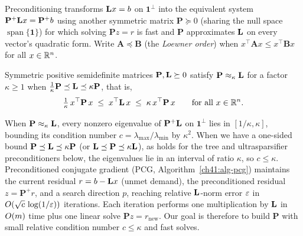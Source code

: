 Preconditioning transforms $\mathbf{L} x = b$ on $\mathbf{1}^\perp$ into the equivalent system $\mathbf{P}^{+}\mathbf{L} x = \mathbf{P}^{+}b$ using another symmetric matrix $\mathbf{P} \succeq 0$ (sharing the null space $\operatorname{span}\{\mathbf{1}\}$) for which solving $\mathbf{P} z = r$ is fast and $\mathbf{P}$ approximates $\mathbf{L}$ on every vector's quadratic form. Write $\mathbf{A} \preceq \mathbf{B}$ (the \emph{Loewner order}) when $x^\top \mathbf{A} x \le x^\top \mathbf{B} x$ for all $x \in \mathbb{R}^n$.

\begin{definition}\label{ch41:def-spectral}
Symmetric positive semidefinite matrices $\mathbf{P},\mathbf{L}\succeq 0$ satisfy $\mathbf{P}\approx_\kappa \mathbf{L}$ for a factor $\kappa \ge 1$ when $\tfrac{1}{\kappa}\mathbf{P} \preceq \mathbf{L} \preceq \kappa\mathbf{P}$, that is,
\[
  \tfrac{1}{\kappa}\,x^\top \mathbf{P}\,x \;\le\; x^\top \mathbf{L}\,x \;\le\; \kappa\,x^\top \mathbf{P}\,x
  \qquad\text{for all } x \in \mathbb{R}^n .
\]
\end{definition}

When $\mathbf{P}\approx_\kappa\mathbf{L}$, every nonzero eigenvalue of $\mathbf{P}^{+}\mathbf{L}$ on $\mathbf{1}^\perp$ lies in $[1/\kappa,\kappa]$, bounding its condition number $c = \lambda_{\max}/\lambda_{\min}$ by $\kappa^2$. When we have a one-sided bound $\mathbf{P}\preceq\mathbf{L}\preceq\kappa\mathbf{P}$ (or $\mathbf{L}\preceq\mathbf{P}\preceq\kappa\mathbf{L}$), as holds for the tree and ultrasparsifier preconditioners below, the eigenvalues lie in an interval of ratio $\kappa$, so $c \le \kappa$. Preconditioned conjugate gradient (PCG, Algorithm~\ref{ch41:alg-pcg}) maintains the current residual $r = b - \mathbf{L} x$ (unmet demand), the preconditioned residual $z = \mathbf{P}^{+}r$, and a search direction $p$, reaching relative $\mathbf{L}$-norm error $\varepsilon$ in $O(\sqrt{c}\,\log(1/\varepsilon))$ iterations. Each iteration performs one multiplication by $\mathbf{L}$ in $O(m)$ time plus one linear solve $\mathbf{P} z = r_{\mathrm{new}}$. Our goal is therefore to build $\mathbf{P}$ with small relative condition number $c \le \kappa$ and fast solves.

